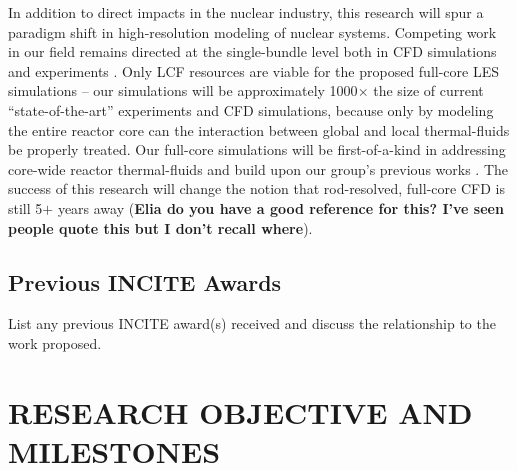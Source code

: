 In addition to direct impacts in the nuclear industry, this research will spur
a paradigm shift in high-resolution modeling of nuclear systems. Competing work
in our field remains directed at the single-bundle level both in CFD
simulations \cite{wang2020,fanning,wang2020b,Boyd2016} and experiments
\cite{Nguyen2017,Bhowmik2021,goth,song_2020,martin2020}. 
Only LCF resources are viable for the proposed full-core LES simulations
-- our simulations will be approximately 1000\(\times\) the size of current
``state-of-the-art'' experiments and CFD simulations, because only by modeling
the entire reactor core can the interaction between global and local
thermal-fluids be properly treated. Our full-core simulations will be
first-of-a-kind in addressing core-wide reactor thermal-fluids and build upon
our group's previous works \cite{Fang2021}. The success of this research will
change the notion
that rod-resolved, full-core CFD is still 5\(+\) years away ({\bf Elia do you
have a good reference for this? I've seen people quote this but I don't recall
where}).


\vspace{-.25in}
\subsection{Previous INCITE Awards}
\vspace{-.2in}


List any previous INCITE award(s) received and discuss the relationship to the
work proposed. 

\vspace{-.25in}
\section{RESEARCH OBJECTIVE AND MILESTONES} %
\vspace{-.2in}


